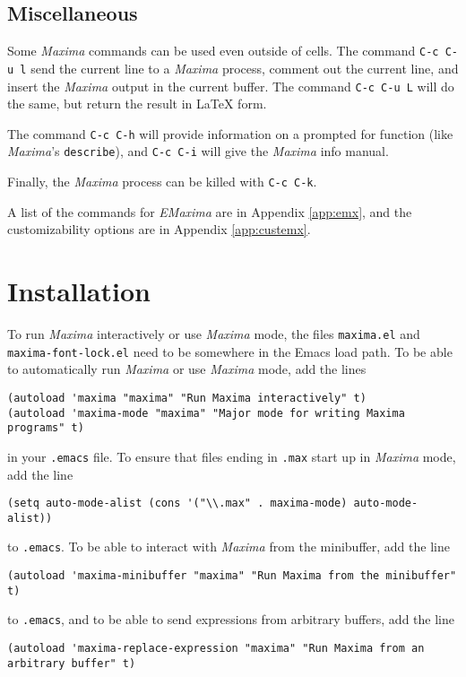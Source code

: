 \documentclass{article}
\newcommand{\emx}{\textsl{\sffamily EMaxima}}
\newcommand{\mx}{\textsl{\sffamily Maxima}}
\begin{document}
\subsection{Miscellaneous}

\noindent
Some \mx{} commands can be used even outside of cells.  The command 
\texttt{C-c C-u l} send the current line to a
\mx{} process, comment out the current line, and insert the \mx{}
output in the current buffer.  The command 
\texttt{C-c C-u L} will do the same, but
return the result in \LaTeX{} form.

The command \texttt{C-c C-h} will provide
information on a prompted for function (like \mx's \texttt{describe}), 
and  \texttt{C-c C-i} will give the \mx{} info manual.

Finally, the \mx{} process can be killed with \texttt{C-c C-k}.

A list of the commands for \emx{} are in Appendix \ref{app:emx}, and
the customizability options are in Appendix \ref{app:custemx}.

\newpage
\appendix

\section{Installation}

To run \mx{} interactively or use \mx{} mode, the files
\texttt{maxima.el} and \texttt{maxima-font-lock.el} need to be
somewhere in the Emacs load path.  To be able to automatically run
\mx{} or use \mx{} mode, add the lines\\
\begin{verbatim}
(autoload 'maxima "maxima" "Run Maxima interactively" t)
(autoload 'maxima-mode "maxima" "Major mode for writing Maxima programs" t)
\end{verbatim}
\noindent
in your \texttt{.emacs} file.  
To ensure that files ending in \texttt{.max} start up in \mx{} mode,
add the line
\begin{verbatim}
(setq auto-mode-alist (cons '("\\.max" . maxima-mode) auto-mode-alist))
\end{verbatim}
to \texttt{.emacs}.  To be able to interact with \mx{} from the
minibuffer, add the line
\begin{verbatim}
(autoload 'maxima-minibuffer "maxima" "Run Maxima from the minibuffer" t)
\end{verbatim}
\noindent
to \texttt{.emacs}, and to be able to send expressions from arbitrary
buffers, add the line
\begin{verbatim}
(autoload 'maxima-replace-expression "maxima" "Run Maxima from an arbitrary buffer" t)
\end{verbatim}
\end{document}

